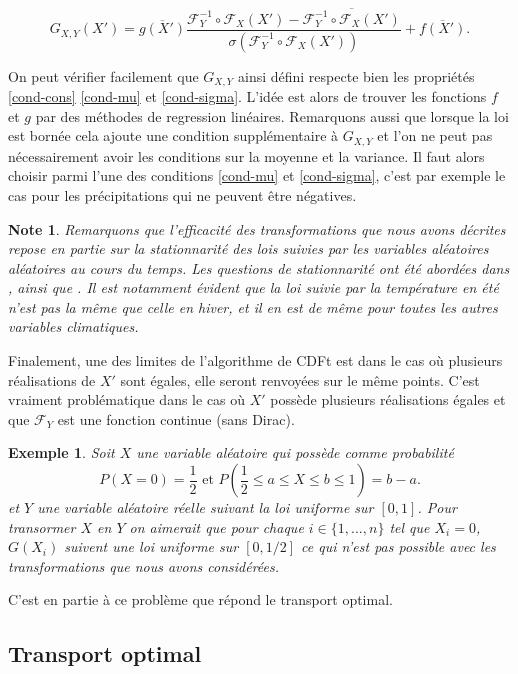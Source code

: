 \documentclass[a4paper,11pt]{article}
\numberwithin{equation}{section}
\newtheorem{example}{Exemple}
\newtheorem{note}{Note}
\begin{document}
\[ G_{X,Y} (X')= \overline{g(X')}\frac{\mathcal{F}^{-1}_{Y}\circ\mathcal{F}_{X}(X')- \overline{\mathcal{F}^{-1}_{Y}\circ\mathcal{F}_{X}(X')}}{\sigma(\mathcal{F}^{-1}_{Y}\circ\mathcal{F}_{X}(X'))} + \overline{f(X')}.\]

On peut vérifier facilement que $G_{X,Y}$ ainsi défini respecte bien les propriétés \eqref{cond-cons} \eqref{cond-mu} et \eqref{cond-sigma}. L'idée est alors de trouver les fonctions $f$ et $g$ par des méthodes de regression linéaires. Remarquons aussi que lorsque la loi est bornée cela ajoute une condition supplémentaire à $G_{X,Y}$ et l'on ne peut pas nécessairement avoir les conditions sur la moyenne et la variance. Il faut alors choisir parmi l'une des conditions \eqref{cond-mu} et \eqref{cond-sigma}, c'est par exemple le cas pour les précipitations qui ne peuvent être négatives. 
\begin{note}
	Remarquons que l'efficacité des transformations que nous avons décrites repose en partie sur la stationnarité des lois suivies par les variables aléatoires aléatoires au cours du temps. Les questions de stationnarité ont été abordées dans \cite{maraun2012nonstationarities}, \cite{christensen2008need} ainsi que \cite{nahar2017assessing}. Il est notamment évident que la loi suivie par la température en été n'est pas la même que celle en hiver, et il en est de même pour toutes les autres variables climatiques.
\end{note}

Finalement, une des limites de l'algorithme de CDFt est dans le cas où plusieurs réalisations de $X'$ sont égales, elle seront renvoyées sur le même points. C'est vraiment problématique dans le cas où $X'$ possède plusieurs réalisations égales et que $\mathcal{F}_Y$ est une fonction continue (sans Dirac).

\begin{example}
	Soit $X$ une variable aléatoire qui possède comme probabilité 
	\[P(X=0)=\frac{1}{2} \textrm{ et } P( \frac{1}{2}\leq a\leq X \leq b\leq 1 )=b-a.\]
	et $Y$ une variable aléatoire réelle suivant la loi uniforme sur $[0,1]$. Pour transormer $X$ en $Y$ on aimerait que pour chaque $i\in \{1,...,n\}$ tel que $X_i=0$, $G(X_i)$ suivent une loi uniforme sur $[0,1/2]$ ce qui n'est pas possible avec les transformations que nous avons considérées.
\end{example}  
C'est en partie à ce problème que répond le transport optimal.

\subsection{Transport optimal}
\label{ch:transport-optimal}
\end{document}
